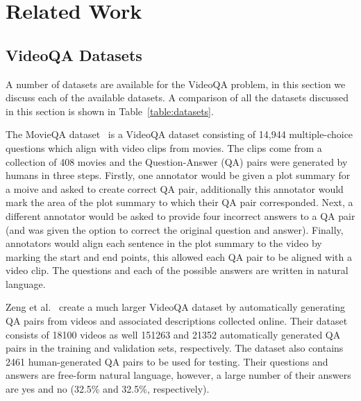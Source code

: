 \documentclass[../interim.tex]{subfiles}
\begin{document}
\section{Related Work} \label{section:related}

\subsection{VideoQA Datasets}

A number of datasets are available for the VideoQA problem, in this section we discuss each of the available datasets. A comparison of all the datasets discussed in this section is shown in Table~\ref{table:datasets}.

The MovieQA dataset~\cite{dataset:movie-qa} is a VideoQA dataset consisting of 14,944 multiple-choice questions which align with video clips from movies. The clips come from a collection of 408 movies and the Question-Answer (QA) pairs were generated by humans in three steps. Firstly, one annotator would be given a plot summary for a moive and asked to create correct QA pair, additionally this annotator would mark the area of the plot summary to which their QA pair corresponded. Next, a different annotator would be asked to provide four incorrect answers to a QA pair (and was given the option to correct the original question and answer). Finally, annotators would align each sentence in the plot summary to the video by marking the start and end points, this allowed each QA pair to be aligned with a video clip. The questions and each of the possible answers are written in natural language.

Zeng et al.~\cite{dataset:zeng} create a much larger VideoQA dataset by automatically generating QA pairs from videos and associated descriptions collected online. Their dataset consists of 18100 videos as well 151263 and 21352 automatically generated QA pairs in the training and validation sets, respectively. The dataset also contains 2461 human-generated QA pairs to be used for testing. Their questions and answers are free-form natural language, however, a large number of their answers are yes and no (32.5\% and 32.5\%, respectively).
\end{document}
